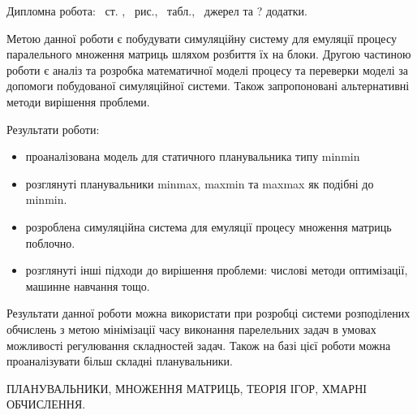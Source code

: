 
Дипломна робота: \pageref*{MyLastPage}~ст. , \totfig~рис.,  \tottab~табл., ~джерел та ? додатки.

Метою данної роботи є побудувати симуляційну систему для емуляції процесу паралельного множення матриць шляхом розбиття їх на блоки. Другою частиною роботи є аналіз та розробка математичної моделі процесу та переверки моделі за допомоги побудованої симуляційної системи. Також запропоновані альтернативні методи вирішення проблеми.

Результати роботи:
\begin{itemize}
	\item проаналізована модель для статичного планувальника типу minmin
	\item розглянуті планувальники minmax, maxmin та maxmax як подібні до minmin.
	\item розроблена симуляційна система для емуляції процесу множення матриць поблочно.
	\item розглянуті інші підходи до вирішення проблеми: числові методи оптимізації, машинне навчання тощо.
\end{itemize}

Результати данної роботи можна використати при розробці системи розподілених обчислень з метою мінімізації часу виконання парелельних задач в умовах можливості регулювання складностей задач. Також на базі цієї роботи можна проаналізувати більш складні планувальники.

\MakeUppercase{Планувальники, множення матриць, теорія ігор, хмарні обчислення.}